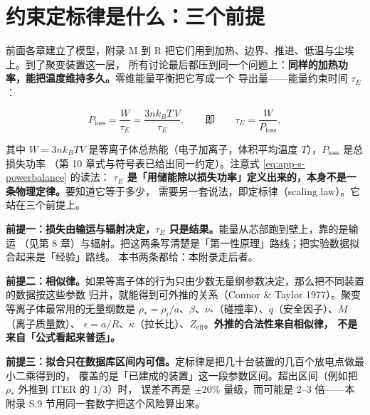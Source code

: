 
\section{约束定标律是什么：三个前提}
\label{sec:app-s-scaling}

前面各章建立了模型，附录 M 到 R 把它们用到加热、边界、推进、低温与尘埃上。到了聚变装置这一层，
所有讨论最后都压到同一个问题上：\textbf{同样的加热功率，能把温度维持多久。}零维能量平衡把它写成一个
导出量——能量约束时间 $\tau_E$：

\begin{equation}
P_{\mathrm{loss}}=\frac{W}{\tau_E}=\frac{3nk_BT\,V}{\tau_E},
\qquad\text{即}\qquad
\tau_E=\frac{W}{P_{\mathrm{loss}}},
\label{eq:app-s-powerbalance}
\end{equation}

其中 $W=3nk_BTV$ 是等离子体总热能（电子加离子，体积平均温度 $T$），$P_{\mathrm{loss}}$ 是总损失功率
（第 10 章式与符号表已给出同一约定）。注意式 \eqref{eq:app-s-powerbalance} 的读法：
\textbf{$\tau_E$ 是「用储能除以损失功率」定义出来的，本身不是一条物理定律。}要知道它等于多少，
需要另一套说法，即定标律（scaling law）。它站在三个前提上。

\textbf{前提一：损失由输运与辐射决定，$\tau_E$ 只是结果。}能量从芯部跑到壁上，靠的是输运
（见第 8 章）与辐射。把这两条写清楚是「第一性原理」路线；把实验数据拟合起来是「经验」路线。
本书两条都给：本附录走后者。

\textbf{前提二：相似律。}如果等离子体的行为只由少数无量纲参数决定，那么把不同装置的数据按这些参数
归并，就能得到可外推的关系（Connor \& Taylor 1977）。聚变等离子体最常用的无量纲数是
$\rho_\ast=\rho_i/a$、$\beta$、$\nu_\ast$（碰撞率）、$q$（安全因子）、$M$（离子质量数）、
$\epsilon=a/R$、$\kappa$（拉长比）、$Z_{\mathrm{eff}}$。\textbf{外推的合法性来自相似律，
不是来自「公式看起来普适」。}

\textbf{前提三：拟合只在数据库区间内可信。}定标律是把几十台装置的几百个放电点做最小二乘得到的，
覆盖的是「已建成的装置」这一段参数区间。超出区间（例如把 $\rho_\ast$ 外推到 ITER 的 1/3）时，
误差不再是 $\pm20\%$ 量级，而可能是 2--3 倍——本附录 S.9 节用同一套数字把这个风险算出来。

